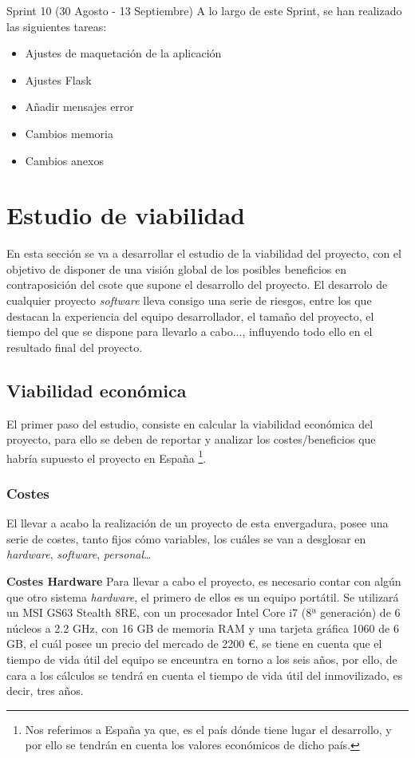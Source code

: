 Sprint 10 (30 Agosto - 13 Septiembre)
A lo largo de este Sprint, se han realizado las siguientes tareas:

\begin{itemize}
    \item Ajustes de maquetación de la aplicación
    \item Ajustes Flask
    \item Añadir mensajes error
    \item Cambios memoria
    \item Cambios anexos
\end{itemize}

\section{Estudio de viabilidad}
En esta sección se va a desarrollar el estudio de la viabilidad del proyecto, con el objetivo de disponer de una visión global de los posibles beneficios en contraposición del csote que supone el desarrollo del proyecto.
El desarrolo de cualquier proyecto \textit{software} lleva consigo una serie de riesgos, entre los que destacan la experiencia del equipo desarrollador, el tamaño del proyecto, el tiempo del que se dispone para llevarlo a cabo..., influyendo todo ello en el resultado final del proyecto.

\subsection{Viabilidad económica}
El primer paso del estudio, consiste en calcular la viabilidad económica del proyecto, para ello se deben de reportar y analizar los costes/beneficios que habría supuesto el proyecto en España \footnote{Nos referimos a España ya que, es el país dónde tiene lugar el desarrollo, y por ello se tendrán en cuenta los valores económicos de dicho país.}.

\subsubsection{Costes}
El llevar a acabo la realización de un proyecto de esta envergadura, posee una serie de costes, tanto fijos cómo variables, los cuáles se van a desglosar en \textit{hardware}, \textit{software}, \textit{personal}\dots

\textbf{Costes Hardware}
Para llevar a cabo el proyecto, es necesario contar con algún que otro sistema \textit{hardware}, el primero de ellos es un equipo portátil. Se utilizará un MSI GS63 Stealth 8RE, con un procesador Intel Core i7 (8ª generación) de 6 núcleos a 2.2 GHz, con 16 GB de memoria RAM y una tarjeta gráfica 1060 de 6 GB, el cuál posee un precio del mercado de 2200 €, se tiene en cuenta que el tiempo de vida útil del equipo se enceuntra en torno a los seis años, 
por ello, de cara a los cálculos se tendrá en cuenta el tiempo de vida útil del inmovilizado, es decir, tres años.

